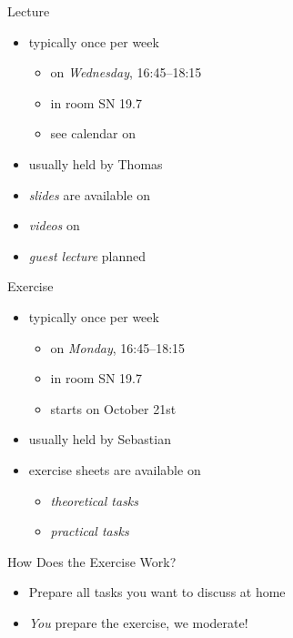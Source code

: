 \begin{frame}{\myframetitle}
	\begin{fancycolumns}
		\begin{definition}{Lecture}
			\begin{itemize}
				\item typically once per week
				\begin{itemize}
					\item on \emph{Wednesday}, 16:45--18:15
					\item in room SN 19.7
					\item see calendar on \StudIP
				\end{itemize}
				\item usually held by Thomas
				\item \emph{slides} are available on \StudIP
				\item \emph{videos} on \Youtube
				\item \emph{guest lecture} planned
			\end{itemize}
		\end{definition}
	\nextcolumn
		\begin{example}{Exercise}
			\begin{itemize}
				\item typically once per week
				\begin{itemize}
					\item on \emph{Monday}, 16:45--18:15
					\item in room SN 19.7
					\item starts on October 21st
				\end{itemize}
				\item usually held by Sebastian
				\item exercise sheets are available on \StudIP
				\begin{itemize}
					\item \emph{theoretical tasks}
					\item \emph{practical tasks}
				\end{itemize}
			\end{itemize}
		\end{example}
		\begin{note}{How Does the Exercise Work?}
			\begin{itemize}
				\item Prepare all tasks you want to discuss at home
				\item \emph{You} prepare the exercise, we moderate!
			\end{itemize}
		\end{note}
	\end{fancycolumns}
\end{frame}


